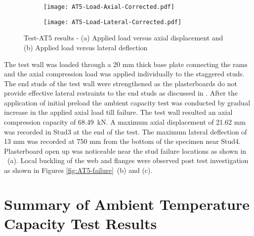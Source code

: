 \begin{figure}[!htbp]
	\centering
	\begin{subfigure}[b]{0.45\textwidth}
		\centering
		\texttt{[image: AT5-Load-Axial-Corrected.pdf]}
		\caption{}
		\label{subfig:AT5-Load-Axial-Corrected}
	\end{subfigure}
	\begin{subfigure}[b]{0.45\textwidth}
		\centering
		\texttt{[image: AT5-Load-Lateral-Corrected.pdf]}
		\caption{}
		\label{subfig:AT5-Load-Lateral-Corrected}
	\end{subfigure}
	   \caption{Test-AT5 results - (a) Applied load versus axial displacement and (b) Applied load versus lateral deflection}
	   \label{fig:AT5-results}
\end{figure}

The test wall was loaded through a 20 mm thick base plate connecting the rams and the axial compression load was applied individually to the staggered studs. The end studs of the test wall were strengthened as the plasterboards do not provide effective lateral restraints to the end studs as discussed in . After the application of initial preload the ambient capacity test was conducted by gradual increase in the applied axial load till failure. The test wall resulted an axial compression capacity of 68.49~kN. A maximum axial displacement of 21.62 mm was recorded in Stud3 at the end of the test. The maximum lateral deflection of 13 mm was recorded at 750 mm from the bottom of the specimen near Stud4. Plasterboard open up was noticeable near the stud failure locations as shown in ~(a). Local buckling of the web and flanges were observed post test investigation as shown in Figures \ref{fig:AT5-failure}~(b) and (c).

\section{Summary of Ambient Temperature Capacity Test Results}

